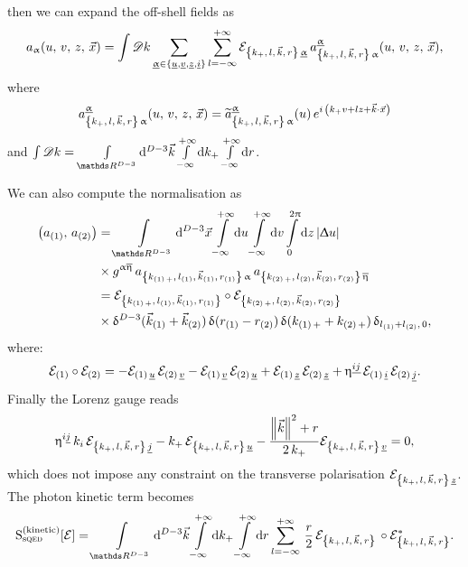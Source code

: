 then we can expand the off-shell fields as
\begin{equation}
  a_{\alpha}\qty(u,\, v,\, z,\, \vec{x} )
  =
  \int \ccD k
  \sum\limits_{%
    \underline{\alpha}
    \in
    \qty{ \underu, \underv, \underz,\underi }
  }
  \infinfsum{l}
  \pol{\alpha}\,
  {a}^{\underline{\alpha}}_{\kmkr\, \alpha}\qty(u,\, v,\, z,\, \vec{x} ),
\end{equation}
where
\begin{equation}
  a^{\underline{\alpha}}_{\kmkr\, \alpha}\qty(u,\, v,\, z,\, \vec{x})
  =
  \tildea^{\underline{\alpha}}_{\kmkr\, \alpha}(u)\,
  e^{i\, \qty( k_+ v + l z + \vec{k} \cdot \vec{x})}
\end{equation}
and $\int \ccD k = \int\limits_{\R^{D-3}} \dd[D-3]{\vec{k}} \infinfint{k_+} \infinfint{r}$.

We can also compute the normalisation as
\begin{equation}
  \begin{split}
    \qty(a_{\qty(1)},\, a_{\qty(2)})
    & =
    \int\limits_{\R^{D-3}} \dd[D-3]{\vec{x}}
    \infinfint{u}
    \infinfint{v}
    \finiteint{z}{0}{2\pi}
    \abs{\Delta u}
    \\
    & \times
    g^{\alpha\beta}\,
    a_{\kmkrN{1}\, \alpha}\,  a_{\kmkrN{2}\, \beta}
    \\
    & =
    \genpolN{1} \circ \genpolN{2}
    \\
    & \times
    \delta^{D-3}( \vec{k}_{\qty(1)} + \vec{k}_{\qty(2)})\,
    \delta( r_{\qty(1)} - r_{\qty(2)})\,
    \delta( k_{\qty(1)\, +} + k_{\qty(2)\, +})\,
    \delta_{l_{\qty(1)} + l_{\qty(2)},\, 0},
  \end{split}
\end{equation}
where:\footnotemark{}
\begin{equation}
  \begin{split}
    \cE_{\qty(1)} \circ \cE_{\qty(2)}
    =
    - \polabbrN{u}{1}\, \polabbrN{v}{2}
    - \polabbrN{v}{1}\, \polabbrN{u}{2}
    + \polabbrN{z}{1}\, \polabbrN{z}{2}
    +
    \eta^{\underline{ij}}\,
    \polabbrN{i}{1}\, \polabbrN{j}{2}.
  \end{split}
\end{equation}
Finally the Lorenz gauge reads
\begin{equation}
   \eta^{i \underj}\, k_i\, \pol{j}
   -
   k_+\, \pol{u}
   -
   \frac{\norm{\vec{k}}^2 + r}{2\, k_+} \pol{v}
   =
   0,
  \label{eq:explicit_orbifold_Lorenz}
\end{equation}
which does not impose any constraint on the transverse polarisation
$\pol{z}$.
The photon kinetic term becomes 
\begin{equation}
  \rS_{\text{s}\qed}^{(\text{kinetic})}\qty[ \cE ]
  =
  \int\limits_{\R^{D-3}} \dd[D-3]{\vec{k}}
  \infinfint{k_+}
  \infinfint{r}
  \infinfsum{l}\,
  \frac{r}{2}\,
  \cE_{\kmkr}\,
  \circ
  \cE_{\kmkr}^*.
\end{equation}


